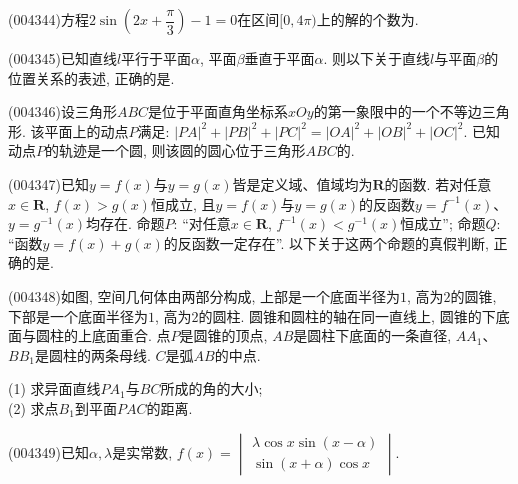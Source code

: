 \item (004344)方程$2\sin (2x+\dfrac{\pi}3)-1=0$在区间$[0,4\pi)$上的解的个数为.
\item (004345)已知直线$l$平行于平面$\alpha$, 平面$\beta$垂直于平面$\alpha$. 则以下关于直线$l$与平面$\beta$的位置关系的表述, 正确的是.
\item (004346)设三角形$ABC$是位于平面直角坐标系$xOy$的第一象限中的一个不等边三角形. 该平面上的动点$P$满足: $|PA|^2+|PB|^2+|PC|^2=|OA|^2+|OB|^2+|OC|^2$. 已知动点$P$的轨迹是一个圆, 则该圆的圆心位于三角形$ABC$的.
\item (004347)已知$y=f(x)$与$y=g(x)$皆是定义域、值域均为$\mathbf{R}$的函数. 若对任意$x\in \mathbf{R}$, $f(x)>g(x)$恒成立, 且$y=f(x)$与$y=g(x)$的反函数$y=f^{-1}(x)$、$y=g^{-1}(x)$均存在. 命题$P$: ``对任意$x\in \mathbf{R}$, $f^{-1}(x)<g^{-1}(x)$恒成立''; 命题$Q$: ``函数$y=f(x)+g(x)$的反函数一定存在''. 以下关于这两个命题的真假判断, 正确的是.
\item (004348)如图, 空间几何体由两部分构成, 上部是一个底面半径为$1$, 高为$2$的圆锥, 下部是一个底面半径为$1$, 高为$2$的圆柱. 圆锥和圆柱的轴在同一直线上, 圆锥的下底面与圆柱的上底面重合. 点$P$是圆锥的顶点, $AB$是圆柱下底面的一条直径, $AA_1$、$BB_1$是圆柱的两条母线. $C$是弧$AB$的中点.
\begin{center}
\end{center}
(1) 求异面直线$PA_1$与$BC$所成的角的大小;\\
(2) 求点$B_1$到平面$PAC$的距离.
\item (004349)已知$\alpha,\lambda$是实常数, $f(x)=\begin{vmatrix}
    \lambda \cos x  \sin (x-\alpha)  \\\sin (x+\alpha)  \cos x  \end{vmatrix}$.\\
